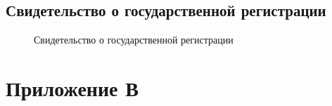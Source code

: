 \newpage

\subsection*{Свидетельство о государственной регистрации}

\begin{figure}[!h]
\caption{Свидетельство о государственной регистрации}
\label{ris:expi_reg}
\end{figure} 

\newpage

\section*{Приложение В}\label{sec:applic_c}
\begin{figure}[!h]
\label{ris:education_act}
\end{figure} 

\newpage

